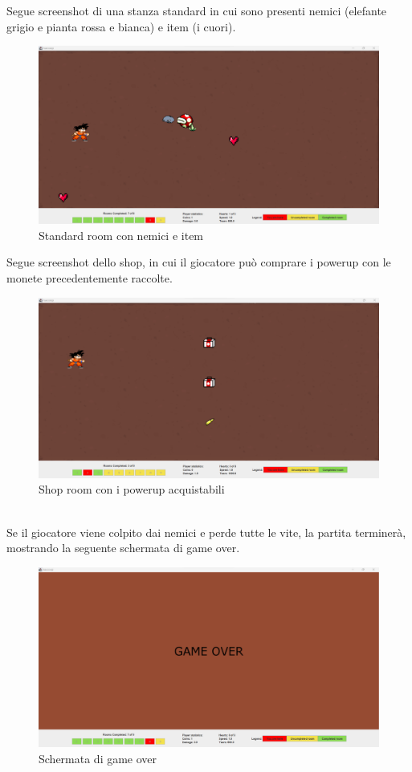 \documentclass[a4paper,12pt]{report}
\begin{document}
\newpage
Segue screenshot di una stanza standard in cui sono presenti nemici 
(elefante grigio e pianta rossa e bianca) e item (i cuori).
\begin{figure}[h]
\centering{}
\includegraphics[width=\textwidth]{img/standardRoom.png}
\caption{Standard room con nemici e item}
\label{img/standardRoom}
\end{figure}

Segue screenshot dello shop, in cui il giocatore può comprare i powerup con
le monete precedentemente raccolte.
\begin{figure}[H]
\centering{}
\includegraphics[width=\textwidth]{img/shop.png}
\caption{Shop room con i powerup acquistabili}
\label{img/shopRoom}
\end{figure}


\\Se il giocatore viene colpito dai nemici e perde tutte le vite, la partita terminerà, mostrando la seguente schermata di game over.
\begin{figure}[H]
\centering{}
\includegraphics[width=\textwidth]{img/gameOver.png}
\caption{Schermata di game over}
\label{img/gameover}
\end{figure}
\end{document}
